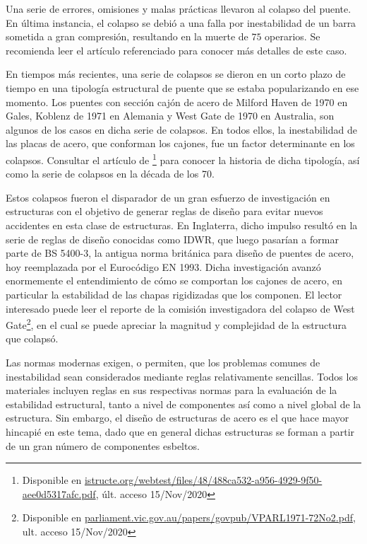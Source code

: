Una serie de errores, omisiones y malas prácticas llevaron al colapso del puente. En última instancia, el colapso se debió a una falla por inestabilidad de un barra sometida a gran compresión, resultando en la muerte de $75$ operarios. Se recomienda leer el artículo referenciado para conocer más detalles de este caso.

En tiempos más recientes, una serie de colapsos se dieron en un corto plazo de tiempo en una tipología estructural de puente que se estaba popularizando en ese momento. %
%
Los puentes con sección cajón de acero de Milford Haven de 1970 en Gales, Koblenz de 1971 en Alemania y West Gate de 1970 en Australia, son algunos de los casos en dicha serie de colapsos. %
%
En todos ellos, la inestabilidad de las placas de acero, que conforman los cajones, fue un factor determinante en los colapsos. %
%
Consultar el artículo de \cite{Firth}\footnote{Disponible en \href{https://www.istructe.org/webtest/files/48/488ca532-a956-4929-9f50-aee0d5317afc.pdf}{istructe.org/webtest/files/48/488ca532-a956-4929-9f50-aee0d5317afc.pdf}, últ. acceso 15/Nov/2020} para conocer la historia de dicha tipología, así como la serie de colapsos en la década de los 70.

Estos colapsos fueron el disparador de un gran esfuerzo de investigación en estructuras con el objetivo de generar reglas de diseño para evitar nuevos accidentes en esta clase de estructuras. %
%
En Inglaterra, dicho impulso resultó en la serie de reglas de diseño conocidas como IDWR, que luego pasarían a formar parte de BS 5400-3, la antigua norma británica para diseño de puentes de acero, hoy reemplazada por el Eurocódigo EN 1993. %
%
Dicha investigación avanzó enormemente el entendimiento de cómo se comportan los cajones de acero, en particular la estabilidad de las chapas rigidizadas que los componen. El lector interesado puede leer el reporte de la comisión investigadora del colapso de West Gate\footnote{Disponible en \href{http://www.parliament.vic.gov.au/papers/govpub/VPARL1971-72No2.pdf}{parliament.vic.gov.au/papers/govpub/VPARL1971-72No2.pdf}, ult. acceso 15/Nov/2020}, en el cual se puede apreciar la magnitud y complejidad de la estructura que colapsó. 

Las normas modernas exigen, o permiten, que los problemas comunes de inestabilidad sean considerados mediante reglas relativamente sencillas. Todos los materiales incluyen reglas en sus respectivas normas para la evaluación de la estabilidad estructural, tanto a nivel de componentes así como a nivel global de la estructura. %
Sin embargo, el diseño de estructuras de acero es el que hace mayor hincapié en este tema, dado que en general dichas estructuras se forman a partir de un gran número de componentes esbeltos. 

